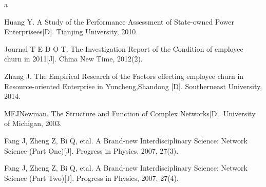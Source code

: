 \documentclass[12pt,a4paper,titlepage]{article}
\begin{document}
a

\begin{thebibliography}{99}

\bibitem{} Huang Y. A Study of the Performance Assessment of State-owned Power Enterprisees[D]. Tianjing University, 2010.

\bibitem{} Journal T E D O T. The Investigation Report of the Condition of employee churn in 2011[J]. China New Time, 2012(2).

\bibitem{} Zhang J. The Empirical Research of the Factors effecting employee churn in Resource-oriented Enterprise in Yuncheng,Shandong [D]. Southerneast University, 2014.

\bibitem{} MEJNewman. The Structure and Function of Complex Networks[D]. University of Michigan, 2003.

\bibitem{} Fang J, Zheng Z, Bi Q, etal. A Brand-new
  Interdisciplinary Science: Network Science (Part One)[J]. Progress in Physics, 2007, 27(3).

\bibitem{} Fang J, Zheng Z, Bi Q, etal. A Brand-new
  Interdisciplinary Science: Network Science (Part Two)[J]. Progress in Physics, 2007, 27(4).

\end{thebibliography}

\label{LastPage}
\end{document}
